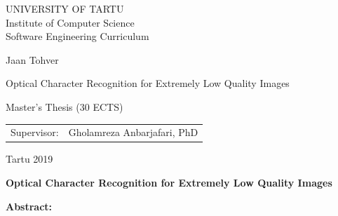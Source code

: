 \documentclass[12pt]{article}
\begin{document}
\thispagestyle{empty}
\begin{center}

\large
UNIVERSITY OF TARTU\\%
Institute of Computer Science\\
Software Engineering Curriculum\\%

\vspace{25mm}

\Large Jaan Tohver

\vspace{4mm}

\huge Optical Character Recognition for Extremely Low Quality Images

\vspace{20mm}

\Large Master's Thesis (30 ECTS)

\end{center}

\vspace{2mm}

\begin{flushright}
 {
 \setlength{\extrarowheight}{5pt}
 \begin{tabular}{r l} 
  \sffamily Supervisor: & \sffamily Gholamreza Anbarjafari, PhD
 \end{tabular}
 }
\end{flushright}


\vfill
\centerline{Tartu 2019}




\newpage

\noindent\textbf{\large Optical Character Recognition for Extremely Low Quality Images}

\vspace*{3ex}

\noindent\textbf{Abstract:}\\
\end{document}

